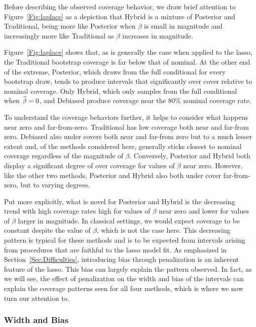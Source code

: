 Before describing the observed coverage behavior, we draw brief attention to Figure~\ref{Fig:laplace} as a depiction that Hybrid is a mixture of Posterior and Traditional, being more like Posterior when $\beta$ is small in magnitude and increasingly more like Traditional as $\beta$ increases in magnitude.

Figure~\ref{Fig:laplace} shows that, as is generally the case when applied to the lasso, the Traditional bootstrap coverage is far below that of nominal. At the other end of the extreme, Posterior, which draws from the full conditional for every bootstrap draw, tends to produce intervals that significantly over cover relative to nominal coverage. Only Hybrid, which only samples from the full conditional when $\widehat{\beta} = 0$, and Debiased produce coverage near the $80\%$ nominal coverage rate.

To understand the coverage behaviors further, it helps to consider what happens near zero and far-from-zero. Traditional has low coverage both near and far-from zero. Debiased also under covers both near and far-from zero but to a much lesser extent and, of the methods considered here, generally sticks closest to nominal coverage regardless of the magnitude of $\beta$. Conversely, Posterior and Hybrid both display a significant degree of over coverage for values of $\beta$ near zero. However, like the other two methods, Posterior and Hybrid also both under cover far-from-zero, but to varying degrees. 

Put more explicitly, what is novel for Posterior and Hybrid is the decreasing trend with high coverage rates high for values of $\beta$ near zero and lower for values of $\beta$ larger in magnitude. In classical settings, we would expect coverage to be constant despite the value of $\beta$, which is not the case here. This decreasing pattern is typical for these methods and is to be expected from intervals arising from procedures that are faithful to the lasso model fit. As emphasized in Section~\ref{Sec:Difficulties}, introducing bias through penalization is an inherent feature of the lasso. This bias can largely explain the pattern observed. In fact, as we will see, the effect of penalization on the width and bias of the intervals can explain the coverage patterns seen for all four methods, which is where we now turn our attention to.

\subsubsection{Width and Bias}\label{Sec:Width and Bias}

